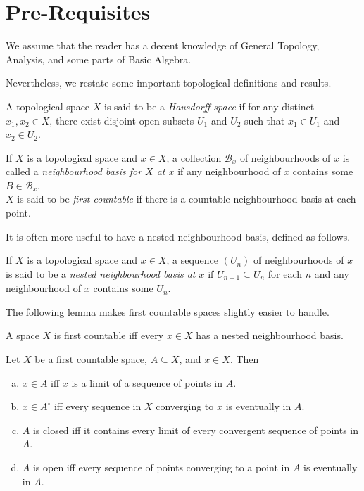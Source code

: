 \section{Pre-Requisites}

We assume that the reader has a decent knowledge of General Topology, Analysis, and some parts of Basic Algebra.

Nevertheless, we restate some important topological definitions and results.

\begin{fdef}
	A topological space $X$ is said to be a \textit{Hausdorff space} if for any distinct $x_1,x_2\in X$, there exist disjoint open subsets $U_1$ and $U_2$ such that $x_1\in U_1$ and $x_2\in U_2$.
\end{fdef}

\begin{definition}
	If $X$ is a topological space and $x\in X$, a collection $\mathcal{B}_x$ of neighbourhoods of $x$ is called a \textit{neighbourhood basis for $X$ at $x$} if any neighbourhood of $x$ contains some $B\in\mathcal{B}_x$.\\
	$X$ is said to be \textit{first countable} if there is a countable neighbourhood basis at each point.
\end{definition}

It is often more useful to have a nested neighbourhood basis, defined as follows.

\begin{definition}
	If $X$ is a topological space and $x\in X$, a sequence $(U_n)$ of neighbourhoods of $x$ is said to be a \textit{nested neighbourhood basis at $x$} if $U_{n+1}\subseteq U_n$ for each $n$ and any neighbourhood of $x$ contains some $U_n$.
\end{definition}

The following lemma makes first countable spaces slightly easier to handle.

\begin{lemma}
	A space $X$ is first countable iff every $x\in X$ has a nested neighbourhood basis.
\end{lemma}

\begin{theorem}
	Let $X$ be a first countable space, $A\subseteq X$, and $x\in X$. Then
	\begin{enumerate}[(a)]
		\item $x\in \overline{A}$ iff $x$ is a limit of a sequence of points in $A$.
		\item $x\in A^\circ$ iff every sequence in $X$ converging to $x$ is eventually in $A$.
		\item $A$ is closed iff it contains every limit of every convergent sequence of points in $A$.
		\item $A$ is open iff every sequence of points converging to a point in $A$ is eventually in $A$.
	\end{enumerate}
\end{theorem}


